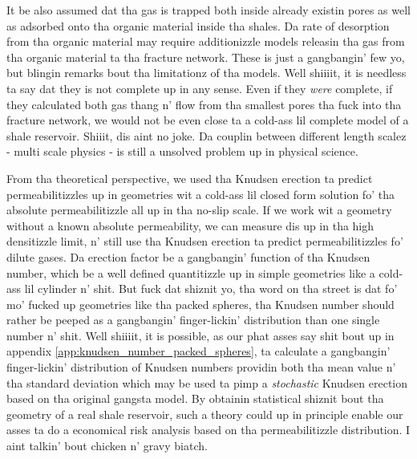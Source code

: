It be also assumed dat tha gas is trapped both inside already existin pores as well as adsorbed onto tha organic material inside tha shales. Da rate of desorption from tha organic material may require additionizzle models releasin tha gas from tha organic material ta tha fracture network. These is just a gangbangin' few yo, but blingin remarks bout tha limitationz of tha models. Well shiiiit, it is needless ta say dat they is not complete up in any sense. Even if they \textit{were} complete, if they calculated both gas thang n' flow from tha smallest pores tha fuck into tha fracture network, we would not be even close ta a cold-ass lil complete model of a shale reservoir. Shiiit, dis aint no joke. Da couplin between different length scalez - multi scale physics - is still a unsolved problem up in physical science.

From tha theoretical perspective, we used tha Knudsen erection ta predict permeabilitizzles up in geometries wit a cold-ass lil closed form solution fo' tha absolute permeabilitizzle all up in tha no-slip scale. If we work wit a geometry without a known absolute permeability, we can measure dis up in tha high densitizzle limit, n' still use tha Knudsen erection ta predict permeabilitizzles fo' dilute gases. Da erection factor be a gangbangin' function of tha Knudsen number, which be a well defined quantitizzle up in simple geometries like a cold-ass lil cylinder n' shit. But fuck dat shiznit yo, tha word on tha street is dat fo' mo' fucked up geometries like tha packed spheres, tha Knudsen number should rather be peeped as a gangbangin' finger-lickin' distribution than one single number n' shit. Well shiiiit, it is possible, as our phat asses say shit bout up in appendix \ref{app:knudsen_number_packed_spheres}, ta calculate a gangbangin' finger-lickin' distribution of Knudsen numbers providin both tha mean value n' tha standard deviation which may be used ta pimp a \textit{stochastic} Knudsen erection based on tha original gangsta model. By obtainin statistical shiznit bout tha geometry of a real shale reservoir, such a theory could up in principle enable our asses ta do a economical risk analysis based on tha permeabilitizzle distribution. I aint talkin' bout chicken n' gravy biatch. 